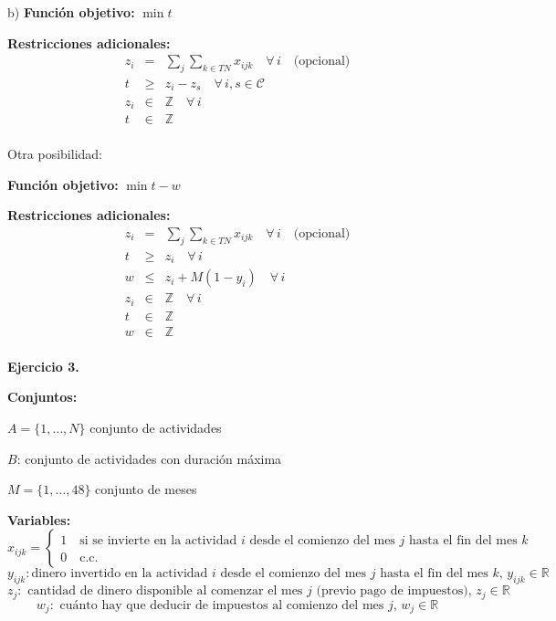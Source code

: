 \documentclass{article}
\newcommand{\dsum}{\displaystyle\sum}
\begin{document}
b) \textbf{Función objetivo:} $\min t$

\textbf{Restricciones adicionales:}
\[
\begin{array}{rcl}
    z_i & = & \dsum_{j}\dsum_{k\in TN} x_{ijk} \quad \forall\,i \quad \text{(opcional)} \\ 
    t & \geq & z_i - z_s \quad \forall\,i,s\in\mathcal{C} \\
    z_i & \in & \mathbb{Z} \quad \forall\,i\\ 
    t & \in & \mathbb{Z}\\ 
\end{array}
\]

Otra posibilidad:

\textbf{Función objetivo:} $\min t - w$

\textbf{Restricciones adicionales:}
\[
\begin{array}{rcl}
    z_i & = & \dsum_{j}\dsum_{k\in TN} x_{ijk} \quad \forall\,i \quad \text{(opcional)} \\ 
    t & \geq & z_i \quad \forall\,i \\
    w & \leq & z_i + M(1-y_i) \quad \forall\,i \\
    z_i & \in & \mathbb{Z} \quad \forall\,i\\ 
    t & \in & \mathbb{Z}\\ 
    w & \in & \mathbb{Z}\\ 
\end{array}
\]

\newpage

\textbf{Ejercicio 3.}

\textbf{Conjuntos:}

$A=\{1,\dots, N\}$ conjunto de actividades

$B$: conjunto de actividades con duración máxima

$M=\{1,\dots, 48\}$ conjunto de meses

\textbf{Variables:}
\[
x_{ijk}= \begin{cases}
1 \quad \text{si se invierte en la actividad $i$ desde el comienzo del mes $j$ hasta el fin del mes $k$}\\
0 \quad \text{c.c.}\end{cases}
\]
\[
y_{ijk}\colon \text{dinero invertido en la actividad $i$ desde el comienzo del mes $j$ hasta el fin del mes $k$, $y_{ijk}\in\mathbb{R}$}
\]
\[
z_j\colon \text{ cantidad de dinero disponible al comenzar el mes $j$ (previo pago de impuestos), $z_j\in\mathbb{R}$}
\]
\[
w_j\colon \text{ cuánto hay que deducir de impuestos al comienzo del mes $j$, $w_j\in\mathbb{R}$}
\]
\end{document}
